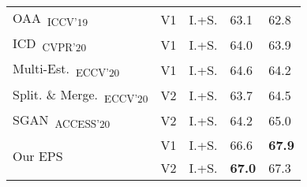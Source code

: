 \documentclass[final]{cvpr}
\begin{document}
\begin{table}[]
{\begin{tabular}{@{}lccll@{}}
\multicolumn{1}{l}{OAA~\cite{jiang2019integral}\textsubscript{ICCV'19}}                 & V1        & I.+S. & 63.1                    & 62.8                     \\
\multicolumn{1}{l}{ICD~\cite{fan2020learning}\textsubscript{CVPR'20}}                   & V1        & I.+S. & 64.0                    & 63.9                     \\
\multicolumn{1}{l}{Multi-Est.~\cite{fan2020employing}\textsubscript{ECCV'20}}           & V1        & I.+S. & 64.6                    & 64.2                     \\
\multicolumn{1}{l}{Split. \& Merge.~\cite{zhang2020splitting}\textsubscript{ECCV'20}}   & V2        & I.+S. & 63.7                    & 64.5                     \\
\multicolumn{1}{l}{SGAN~\cite{yao2020saliency}\textsubscript{ACCESS'20}}                & V2        & I.+S. & 64.2                    & 65.0                     \\ \midrule
\multicolumn{1}{l}{\multirow{2}{*}{Our EPS}}                                            & V1        & I.+S. & 66.6                    & \textbf{67.9}            \\
\multicolumn{1}{l}{}                                                                    & V2        & I.+S. & \textbf{67.0}           & 67.3                     \\ \bottomrule


\end{tabular}}
\end{table}
\end{document}
